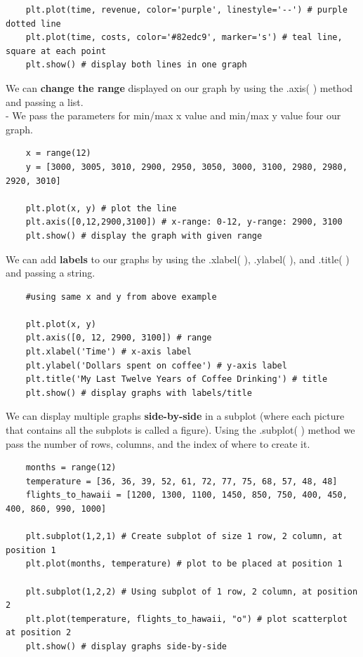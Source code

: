\documentclass[11pt, a4paper]{article}
\begin{document}
\begin{spacing}{1.1}
\begin{lstlisting}
	plt.plot(time, revenue, color='purple', linestyle='--') # purple dotted line
	plt.plot(time, costs, color='#82edc9', marker='s') # teal line, square at each point
	plt.show() # display both lines in one graph \end{lstlisting}\vspace*{1mm}
	We can \textbf{change the range} displayed on our graph by using the .axis( ) method and passing a list. \\
	\hspace*{3mm} - We pass the parameters for min/max x value and min/max y value four our graph.
	\begin{lstlisting}
	x = range(12)
	y = [3000, 3005, 3010, 2900, 2950, 3050, 3000, 3100, 2980, 2980, 2920, 3010]
	
	plt.plot(x, y) # plot the line
	plt.axis([0,12,2900,3100]) # x-range: 0-12, y-range: 2900, 3100
	plt.show() # display the graph with given range \end{lstlisting}\vspace*{1mm}
	We can add \textbf{labels} to our graphs by using the .xlabel( ), .ylabel( ), and .title( ) and passing a string.
	\begin{lstlisting}
	#using same x and y from above example
	
	plt.plot(x, y)
	plt.axis([0, 12, 2900, 3100]) # range
	plt.xlabel('Time') # x-axis label
	plt.ylabel('Dollars spent on coffee') # y-axis label
	plt.title('My Last Twelve Years of Coffee Drinking') # title
	plt.show() # display graphs with labels/title \end{lstlisting}\vspace*{1mm}
	We can display multiple graphs \textbf{side-by-side} in a subplot (where each picture that contains all the subplots is called a figure). Using the .subplot( ) method we pass the number of rows, columns, and the index of where to create it.
	\begin{lstlisting}
	months = range(12)
	temperature = [36, 36, 39, 52, 61, 72, 77, 75, 68, 57, 48, 48]
	flights_to_hawaii = [1200, 1300, 1100, 1450, 850, 750, 400, 450, 400, 860, 990, 1000]
	
	plt.subplot(1,2,1) # Create subplot of size 1 row, 2 column, at position 1
	plt.plot(months, temperature) # plot to be placed at position 1
	
	plt.subplot(1,2,2) # Using subplot of 1 row, 2 column, at position 2
	plt.plot(temperature, flights_to_hawaii, "o") # plot scatterplot at position 2
	plt.show() # display graphs side-by-side \end{lstlisting} \newpage


\end{spacing}
\end{document}
